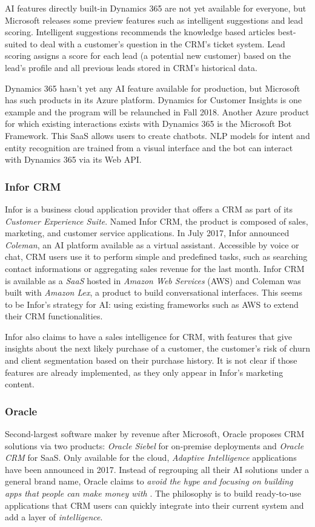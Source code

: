 AI features directly built-in Dynamics 365 are not yet available for everyone, but Microsoft releases some preview features such as intelligent suggestions and lead scoring. Intelligent suggestions recommends the knowledge based articles best-suited to deal with a customer's question in the CRM's ticket system. Lead scoring assigns a score for each lead (a potential new customer) based on the lead's profile and all previous leads stored in CRM's historical data.

Dynamics 365 hasn't yet any AI feature available for production, but Microsoft has such products in its Azure platform. Dynamics for Customer Insights is one example and the program will be relaunched in Fall 2018. Another Azure product for which existing interactions exists with Dynamics 365 is the Microsoft Bot Framework. This SaaS allows users to create chatbots. NLP models for intent and entity recognition are trained from a visual interface and the bot can interact with Dynamics 365 via its Web API.

\subsubsection*{Infor CRM}
Infor is a business cloud application provider that offers a CRM as part of its \textit{Customer Experience Suite}. Named Infor CRM, the product is composed of sales, marketing, and customer service applications. In July 2017, Infor announced \textit{Coleman}, an AI platform available as a virtual assistant. Accessible by voice or chat, CRM users use it to perform simple and predefined tasks, such as searching contact informations or aggregating sales revenue for the last month. Infor CRM is available as a \textit{SaaS} hosted in \textit{Amazon Web Services} (AWS) and Coleman was built with \textit{Amazon Lex}, a product to build conversational interfaces. This seems to be Infor's strategy for AI: using existing frameworks such as AWS to extend their CRM functionalities.

Infor also claims to have a sales intelligence for CRM, with features that give insights about the next likely purchase of a customer, the customer's risk of churn and client segmentation based on their purchase history. It is not clear if those features are already implemented, as they only appear in Infor's marketing content.\nocite{infor-website}


\subsubsection*{Oracle}
Second-largest software maker by revenue after Microsoft, Oracle proposes CRM solutions via two products: \textit{Oracle Siebel} for on-premise deployments and \textit{Oracle CRM} for SaaS. Only available for the cloud, \textit{Adaptive Intelligence} applications have been announced in 2017. Instead of regrouping all their AI solutions under a general brand name, Oracle claims to \textit{avoid the hype and focusing on building apps that people can make money with }\cite{crm-techmerge}. The philosophy is to build ready-to-use applications that CRM users can quickly integrate into their current system and add a layer of \textit{intelligence}.


